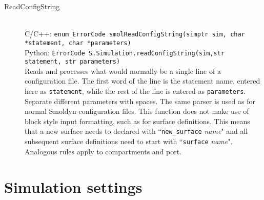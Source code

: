\documentclass {scrbook}
\newcommand {\ttt} {\texttt}
\begin{document}
\begin{description}
\item[ReadConfigString]
\hfill \\
C/C++: \ttt{enum ErrorCode smolReadConfigString(simptr sim, char *statement, char *parameters)}\\
Python: \ttt{ErrorCode S.Simulation.readConfigString(sim,str statement, str parameters)}\\
Reads and processes what would normally be a single line of a configuration file. The first word of the line is the statement name, entered here as \ttt{statement}, while the rest of the line is entered as \ttt{parameters}. Separate different parameters with spaces. The same parser is used as for normal Smoldyn configuration files. This function does not make use of block style input formatting, such as for surface definitions. This means that a new surface needs to declared with ``\ttt{new\_surface} \emph{name}" and all subsequent surface definitions need to start with ``\ttt{surface} \emph{name}". Analogous rules apply to compartments and port.

\end{description}

\section{Simulation settings}
\end{document}
